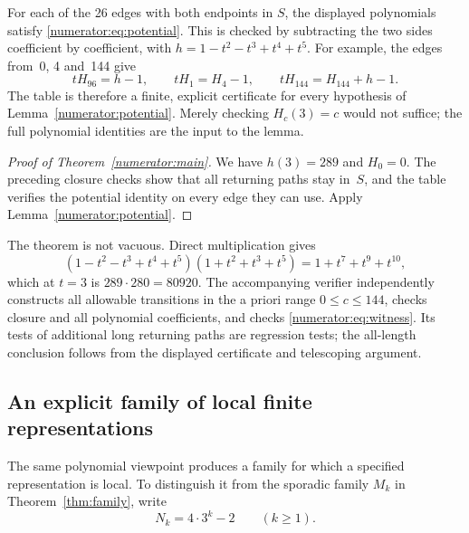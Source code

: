 For each of the 26 edges with both endpoints in $S$, the displayed
polynomials satisfy \eqref{numerator:eq:potential}. This is checked
by subtracting the two sides coefficient by coefficient, with
$h=1-t^2-t^3+t^4+t^5$. For example, the edges from~0, 4 and~144 give
\[
 tH_{96}=h-1,\qquad tH_1=H_4-1,\qquad
 tH_{144}=H_{144}+h-1.
\]
The table is therefore a finite, explicit certificate for every
hypothesis of Lemma~\ref{numerator:potential}. Merely checking
$H_c(3)=c$ would not suffice; the full polynomial identities are the
input to the lemma.

\begin{proof}[Proof of Theorem~\ref{numerator:main}]
We have $h(3)=289$ and $H_0=0$. The preceding closure checks show that
all returning paths stay in~$S$, and the table verifies the potential
identity on every edge they can use. Apply
Lemma~\ref{numerator:potential}.
\end{proof}

The theorem is not vacuous. Direct multiplication gives
\begin{equation}\label{numerator:eq:witness}
 (1-t^2-t^3+t^4+t^5)(1+t^2+t^3+t^5)
       =1+t^7+t^9+t^{10},
\end{equation}
which at $t=3$ is $289\cdot280=80920$.
The accompanying verifier independently constructs all allowable
transitions in the a priori range $0\le c\le144$, checks closure and
all polynomial coefficients, and checks \eqref{numerator:eq:witness}.
Its tests of additional long returning paths are regression tests;
the all-length conclusion follows from the displayed certificate and
telescoping argument.

\subsection{An explicit family of local finite representations}

The same polynomial viewpoint produces a family for which a specified
representation is local. To distinguish it from the sporadic family
$M_k$ in Theorem~\ref{thm:family}, write
\[
 N_k=4\cdot3^k-2\qquad(k\ge1).
\]

